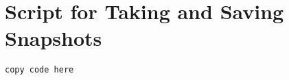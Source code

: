 \section{Script for Taking and Saving Snapshots}
\label{appendix:snapshots}

\begin{lstlisting}
copy code here
\end{lstlisting}
